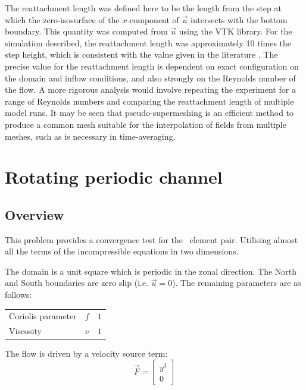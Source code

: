 The reattachment length was defined here to be the length
from the step at which the zero-isosurface of the $x$-component of $\vec{u}$ intersects with
the bottom boundary. This quantity was computed from $\vec{u}$
using the VTK library. For the simulation described, the reattachment
length was approximately 10 times the step height, which is consistent with the value
given in the literature \cite{le1997}.
The precise value for the reattachment length is dependent on exact configuration on the domain and inflow
conditions, and also strongly on the Reynolds number of the flow.
A more rigorous analysis would involve
repeating the experiment for a range of Reynolds numbers and comparing the reattachment
length of multiple model runs. It may be seen that pseudo-supermeshing is an efficient
method to produce a common mesh suitable for the interpolation of fields from multiple
meshes, such as is necessary in time-averaging.



\section{Rotating periodic channel}
\label{sect:periodic_channel}

\subsection{Overview}

This problem provides a convergence test for the \PoDGPt\ element pair.
Utilising almost all the terms of the incompressible equations in two
dimensions.

The domain is a unit square which is periodic in the zonal direction. The
North and South boundaries are zero slip (i.e. $\vec{u}=0$). The remaining
parameters are as follows:

\begin{tabular}{lll}
  Coriolis parameter & $f$ & $1$ \\
  Viscosity & $\nu$ & $1$ 
\end{tabular}

The flow is driven by a velocity source term:
\begin{equation}
  \vec{F}=
  \begin{bmatrix}
    y^3 \\
    0
  \end{bmatrix}
\end{equation}

